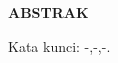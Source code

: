 {}

\begin{center}
	\textbf{ABSTRAK}
\end{center}
\vspace{\baselineskip}

\lipsum[23-25]

\vspace{1\baselineskip}
\noindent Kata kunci: -,-,-.